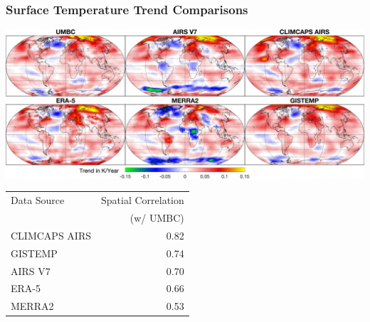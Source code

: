 \documentclass[10pt,t]{beamer}
\begin{document}
\begin{frame}
\frametitle{Surface Temperature Trend Comparisons}  
\vspace{-0.15in}
\begin{center}
\includegraphics[width=\linewidth]{SunClimate2022/tsurf_maps_6sources_giss.png}
\end{center}

\vspace{0.1in}
\footnotesize
\begin{center}
\begin{tabular}{lr}
\hline
Data Source & Spatial Correlation\\
 & (w/ UMBC)\\
\hline
CLIMCAPS AIRS & 0.82\\
GISTEMP & 0.74\\
AIRS V7 & 0.70\\
ERA-5 & 0.66\\
MERRA2 & 0.53\\
\hline
\end{tabular}
\end{center}
\end{frame}
\end{document}

